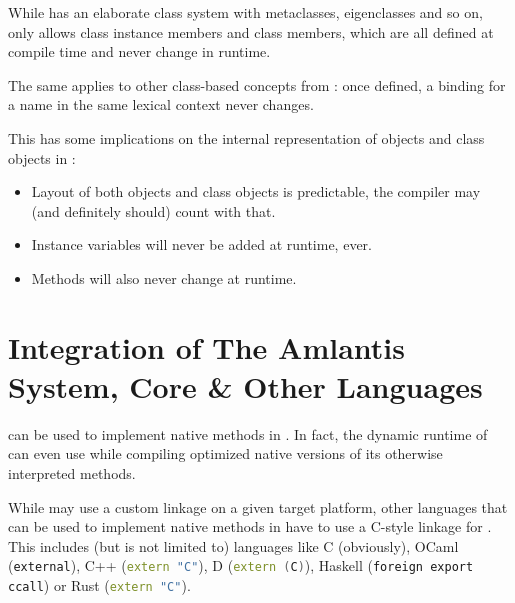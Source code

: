 While \Aml has an elaborate class system with metaclasses, eigenclasses and so on, \AmlSystem only allows class instance members and class members, which are all defined at compile time and never change in runtime. 

The same applies to other class-based concepts from \Aml: once defined, a binding for a name in the same lexical context never changes. 

This has some implications on the internal representation of objects and class objects in \AmlSystem: 
\begin{itemize}
  \item Layout of both objects and class objects is predictable, the compiler may (and definitely should) count with that. 
  \item Instance variables will never be added at runtime, ever. 
  \item Methods will also never change at runtime. 
\end{itemize}





\section{Integration of The Amlantis System, Core \& Other Languages}

\AmlSystem can be used to implement native methods in \Aml. In fact, the dynamic runtime of \Aml can even use \AmlSystem while compiling optimized native versions of its otherwise interpreted methods. 

While \AmlSystem may use a custom linkage on a given target platform, other languages that can be used to implement native methods in \Aml have to use a C-style linkage for . This includes (but is not limited to) languages like 
C (obviously), 
OCaml (\lstinline[language={[Objective]Caml}]!external!), 
C++ (\lstinline[language=C++]!extern "C"!), 
D (\lstinline[language=C++]!extern (C)!), 
Haskell (\lstinline[language=Haskell]!foreign export ccall!) or 
Rust (\lstinline[language=C++]!extern "C"!). 



